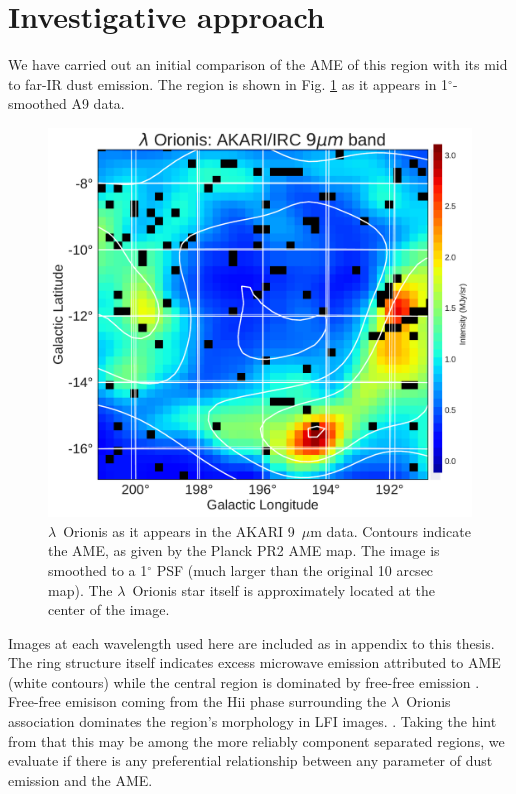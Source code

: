 \section{Investigative approach}
  We have carried out an initial comparison of the AME of this region with its mid to far-IR dust emission. The region is shown in Fig. \ref{fig:orionis-akari9} as it appears in 1$^{\circ}$-smoothed A9 data.
      \begin{figure}
        \includegraphics[width=\textwidth]{../Plots/LOri_akari9_AMEcont_1dres.pdf}
        \centering
        \caption{$\lambda$~Orionis as it appears in the AKARI 9~$\mu$m data. Contours indicate the AME, as given by the Planck PR2 AME map. The image is smoothed to a 1$^{\circ}$ PSF (much larger than the original 10 arcsec map). The $\lambda$~Orionis star itself is approximately located at the center of the image.}
        \label{fig:orionis-akari9}
      \end{figure}
      Images at each wavelength used here are included as in appendix to this thesis.
   The ring structure itself indicates excess microwave emission attributed to AME (white contours) while the central region is dominated by free-free emission \citep{aran09, koenig15}. Free-free emisison coming from the Hii phase surrounding the $\lambda$~Orionis association dominates the region's morphology in LFI images. \citep{planck15XXV}. Taking the hint from \cite{planck15XXV} that this may be among the more reliably component separated regions, we evaluate if there is any preferential relationship between any parameter of dust emission and the AME.

